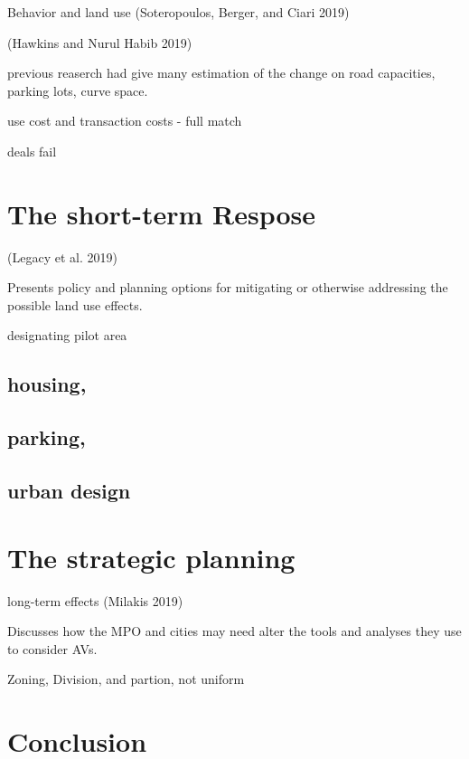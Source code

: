 \documentclass[12pt,]{article}
\begin{document}
Behavior and land use (Soteropoulos, Berger, and Ciari 2019)

(Hawkins and Nurul Habib 2019)

previous reaserch had give many estimation of the change on road
capacities, parking lots, curve space.

use cost and transaction costs - full match

deals fail

\hypertarget{the-short-term-respose}{%
\section{The short-term Respose}\label{the-short-term-respose}}

(Legacy et al. 2019)

Presents policy and planning options for mitigating or otherwise
addressing the possible land use effects.

designating pilot area

\hypertarget{housing}{%
\subsection{housing,}\label{housing}}

\hypertarget{parking}{%
\subsection{parking,}\label{parking}}

\hypertarget{urban-design}{%
\subsection{urban design}\label{urban-design}}

\hypertarget{the-strategic-planning}{%
\section{The strategic planning}\label{the-strategic-planning}}

long-term effects (Milakis 2019)

Discusses how the MPO and cities may need alter the tools and analyses
they use to consider AVs.

Zoning, Division, and partion, not uniform

\hypertarget{conclusion}{%
\section{Conclusion}\label{conclusion}}
\end{document}
